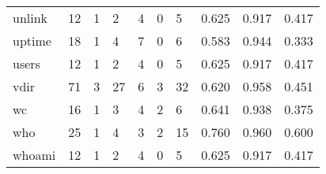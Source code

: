\begin{longtable}{lp{1.3cm}p{1.3cm}p{1.3cm}p{1.3cm}p{1.3cm}p{1.3cm}p{1.3cm}p{1.3cm}p{1.3cm}}
unlink    &                     12 &                                             1 &                                            2 &                                           4 &                                            0 &                                          5 &                                0.625 &                                  0.917 &                                0.417 \\
uptime    &                     18 &                                             1 &                                            4 &                                           7 &                                            0 &                                          6 &                                0.583 &                                  0.944 &                                0.333 \\
users     &                     12 &                                             1 &                                            2 &                                           4 &                                            0 &                                          5 &                                0.625 &                                  0.917 &                                0.417 \\
vdir      &                     71 &                                             3 &                                           27 &                                           6 &                                            3 &                                         32 &                                0.620 &                                  0.958 &                                0.451 \\
wc        &                     16 &                                             1 &                                            3 &                                           4 &                                            2 &                                          6 &                                0.641 &                                  0.938 &                                0.375 \\
who       &                     25 &                                             1 &                                            4 &                                           3 &                                            2 &                                         15 &                                0.760 &                                  0.960 &                                0.600 \\
whoami    &                     12 &                                             1 &                                            2 &                                           4 &                                            0 &                                          5 &                                0.625 &                                  0.917 &                                0.417 \\

\end{longtable}
